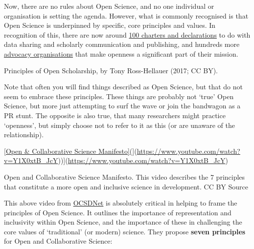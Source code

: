 \documentclass[]{book}
\begin{document}
{{{Now, there are no rules about Open Science, and no one individual or organisation is setting the agenda. However, what is commonly recognised is that Open Science is underpinned by specific, core principles and values. In recognition of this, there are now around \href{https://docs.google.com/spreadsheets/d/1-aRXFiRg-VL9hpLpxoJqX6-OC-A0R2oCogHfIx52Nug/edit\#gid=956616118}{100 charters and declarations} to do with data sharing and scholarly communication and publishing, and hundreds more \href{http://oad.simmons.edu/oadwiki/Advocacy_organizations_for_OA}{advocacy organisations} that make openness a significant part of their mission.

Principles of Open Scholarship, by Tony Ross-Hellauer (2017; CC BY).

Note that often you will find things described as Open Science, but that do not seem to embrace these principles. These things are probably not `true' Open Science, but more just attempting to surf the wave or join the bandwagon as a PR stunt. The opposite is also true, that many researchers might practice `openness', but simply choose not to refer to it as this (or are unaware of the relationship).

\href{images/0.jpg}{{[}Open \& Collaborative Science Manifesto{]}(}{]}(\url{https://www.youtube.com/watch?v=Y1X0xtB_JcY})){]}(\url{https://www.youtube.com/watch?v=Y1X0xtB_JcY})

Open and Collaborative Science Manifesto. This video describes the 7 principles that constitute a more open and inclusive science in development. CC BY Source

This above video from \href{https://ocsdnet.org/manifesto/open-science-manifesto/}{OCSDNet} is absolutely critical in helping to frame the principles of Open Science. It outlines the importance of representation and inclusivity within Open Science, and the importance of these in challenging the core values of `traditional' (or modern) science. They propose \textbf{seven principles} for Open and Collaborative Science:

}}}
\end{document}
